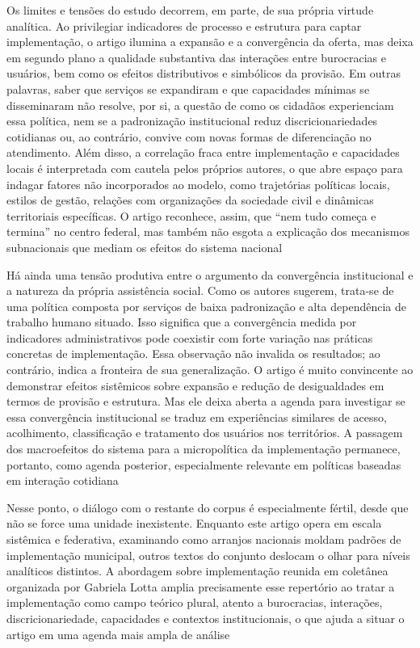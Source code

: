 \documentclass[12pt,a4paper]{article}
\begin{document}
Os limites e tensões do estudo decorrem, em parte, de sua própria virtude analítica. Ao privilegiar indicadores de processo e estrutura para captar implementação, o artigo ilumina a expansão e a convergência da oferta, mas deixa em segundo plano a qualidade substantiva das interações entre burocracias e usuários, bem como os efeitos distributivos e simbólicos da provisão. Em outras palavras, saber que serviços se expandiram e que capacidades mínimas se disseminaram não resolve, por si, a questão de como os cidadãos experienciam essa política, nem se a padronização institucional reduz discricionariedades cotidianas ou, ao contrário, convive com novas formas de diferenciação no atendimento. Além disso, a correlação fraca entre implementação e capacidades locais é interpretada com cautela pelos próprios autores, o que abre espaço para indagar fatores não incorporados ao modelo, como trajetórias políticas locais, estilos de gestão, relações com organizações da sociedade civil e dinâmicas territoriais específicas. O artigo reconhece, assim, que “nem tudo começa e termina” no centro federal, mas também não esgota a explicação dos mecanismos subnacionais que mediam os efeitos do sistema nacional\parencite{bichir2020_sistemas_nacionais}

Há ainda uma tensão produtiva entre o argumento da convergência institucional e a natureza da própria assistência social. Como os autores sugerem, trata-se de uma política composta por serviços de baixa padronização e alta dependência de trabalho humano situado. Isso significa que a convergência medida por indicadores administrativos pode coexistir com forte variação nas práticas concretas de implementação. Essa observação não invalida os resultados; ao contrário, indica a fronteira de sua generalização. O artigo é muito convincente ao demonstrar efeitos sistêmicos sobre expansão e redução de desigualdades em termos de provisão e estrutura. Mas ele deixa aberta a agenda para investigar se essa convergência institucional se traduz em experiências similares de acesso, acolhimento, classificação e tratamento dos usuários nos territórios. A passagem dos macroefeitos do sistema para a micropolítica da implementação permanece, portanto, como agenda posterior, especialmente relevante em políticas baseadas em interação cotidiana\parencite{bichir2020_sistemas_nacionais}

Nesse ponto, o diálogo com o restante do corpus é especialmente fértil, desde que não se force uma unidade inexistente. Enquanto este artigo opera em escala sistêmica e federativa, examinando como arranjos nacionais moldam padrões de implementação municipal, outros textos do conjunto deslocam o olhar para níveis analíticos distintos. A abordagem sobre implementação reunida em coletânea organizada por Gabriela Lotta amplia precisamente esse repertório ao tratar a implementação como campo teórico plural, atento a burocracias, interações, discricionariedade, capacidades e contextos institucionais, o que ajuda a situar o artigo em uma agenda mais ampla de análise\parencite{lotta2019_teorias_analises,bichir2020_sistemas_nacionais}
\end{document}
